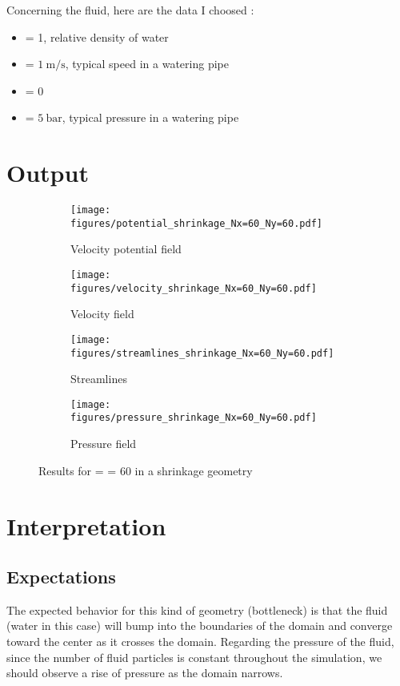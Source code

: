 Concerning the fluid, here are the data I choosed :
\begin{itemize}
      \item {} = 1, relative density of water
      \item {} = $\SI{1}{\meter\per\second}$, typical speed in a watering
            pipe
      \item {} = 0
      \item {} = $\SI{5}{\bar}$, typical pressure in a watering
            pipe
\end{itemize}

\section{Output}
\begin{figure}[htbp]
      \centering
      \begin{subfigure}{.45\textwidth}
            \texttt{[image: figures/potential\_shrinkage\_Nx=60\_Ny=60.pdf]}
            \caption{Velocity potential field}\label{fig:vel_pot_field}
      \end{subfigure}
      \begin{subfigure}{.45\textwidth}
            \texttt{[image: figures/velocity\_shrinkage\_Nx=60\_Ny=60.pdf]}
            \caption{Velocity field}\label{fig:velocity_field}
      \end{subfigure}

      \centering
      \begin{subfigure}{.45\textwidth}
            \texttt{[image: figures/streamlines\_shrinkage\_Nx=60\_Ny=60.pdf]}
            \caption{Streamlines}\label{fig:streamlines}
      \end{subfigure}
      \begin{subfigure}{.45\textwidth}
            \texttt{[image: figures/pressure\_shrinkage\_Nx=60\_Ny=60.pdf]}
            \caption{Pressure field}\label{fig:pressure_field}
      \end{subfigure}
      \caption{Results for  =  = \num{60} in a shrinkage geometry}
\end{figure}

\newpage
\section{Interpretation}
\subsection{Expectations}
The expected behavior for this kind of geometry (bottleneck) is that the fluid
(water in this case) will bump into the boundaries of the domain and converge
toward the center as it crosses the domain. Regarding the pressure of the
fluid, since the number of fluid particles is constant throughout the
simulation, we should observe a rise of pressure as the domain narrows.

